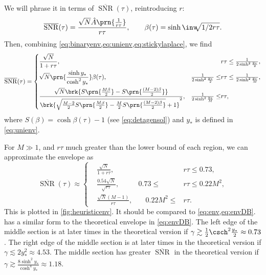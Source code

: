 \documentclass[12pt]{article}
\DeclareMathOperator{\snr}{SNR}
\newcommand{\snrb}{\overline{\snr}}
\begin{document}
We will phrase it in terms of \(\snrb(\tau)\), reintroducing \(r\):
%
\begin{equation}\label{eq:envunits}
  \snrb(\tau) = \frac{ \sqrt{N} \hat{A}\prn{\frac{1}{r\tau}} }{ r\tau },
  \qquad
  \beta(\tau) = \sinh\inv \!\!\sqrt{1/2r\tau}.
\end{equation}
%
Then, combining \cref{eq:binaryenv,eq:unienv,eq:stickylaplace}, 
we find
%
\begin{equation}\label{eq:henv}
  \snrb(\tau) = \left\{
\begin{aligned}
  & \frac{\sqrt{N}}{1+r\tau}, &
  & r\tau \leq \tfrac{1}{2\sinh^2\frac{y_*}{2}} , \\
  & \sqrt{N} \prn{\frac{ \sinh y_* }{ \cosh^2 y_* }} \beta(\tau), &
  \tfrac{1}{2\sinh^2 \frac{y_*}{2}} \leq & r\tau \leq \tfrac{1}{2\sinh^2 \frac{y_*}{M}} , \\
  & \frac{\sqrt{N}\brk{S\prn{\tfrac{M\beta}{2}} - S\prn{\tfrac{(M-2)\beta}{2}}}}
        {\brk{\sqrt{{\frac{M-2}{2} S\prn{\tfrac{M\beta}{2}} - \frac{M}{2} S\prn{\tfrac{(M-2)\beta}{2}}}} + 1}^2} , &
  \tfrac{1}{2\sinh^2 \frac{y_*}{M}} \leq & r\tau ,
\end{aligned}
\right.
\end{equation}
%
where \(S(\beta) = \cosh \beta(\tau) - 1\) (see \cref{eq:detagensol}) and \(y_*\) is defined in \cref{eq:unienv}.

For \(M \gg 1\), and \(r\tau\) much greater than the lower bound of each region, we can approximate the envelope as
%
\begin{equation}\label{eq:henvapprox}
  \snrb(\tau) \approx \left\{
\begin{aligned}
  & \frac{\sqrt{N}}{1+r\tau}, &
  & r\tau \leq 0.73 , \\
  & \frac{ 0.54\sqrt{N}}{ \sqrt{r\tau} } , &
  0.73 \leq & r\tau \leq 0.22 M^2 , \\
  & \frac{ \sqrt{N} (M-1) }{ r\tau }, &\quad
  0.22 M^2 \leq &r\tau .
\end{aligned}
\right.
\end{equation}
%
This is plotted in \cref{fig:heuristicenv}.
It should be compared to \cref{eq:env,eq:envDB}.
 has a similar form to the theoretical envelope in \cref{eq:envDB}.
The left edge of the middle section is at later times in the theoretical version if \(\gamma \gtrsim \frac{1}{2} \csch^2 \frac{y_\ast}{2} \approx 0.73 \).
The right edge of the middle section is at later times in the theoretical version if \(\gamma \lesssim 2 y_\ast^2 \approx 4.53 \).
The middle section has greater \(\snrb\) in the theoretical version if \(\gamma \gtrsim \frac{8\sinh^2y_\ast}{\cosh^4y_\ast} \approx 1.18 \).
\end{document}
